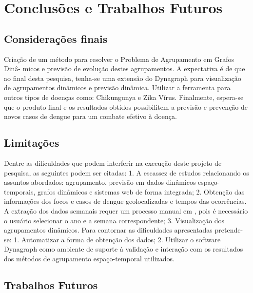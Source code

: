 \chapter{Conclusões e Trabalhos Futuros}
\label{chap:conclusoes-e-trabalhos-futuros}

\section{Considerações finais}
\label{sec:contribuicoes-do-trabalho}

Criação de um método para resolver o Problema de Agrupamento em Grafos Dinâ-
micos e previsão de evolução destes agrupamentos.
A expectativa é de que ao final desta pesquisa, tenha-se uma extensão do Dynagraph
para visualização de agrupamentos dinâmicos e previsão dinâmica.
Utilizar a ferramenta para outros tipos de doenças como: Chikungunya e Zika Vírus.
Finalmente, espera-se que o produto final e os resultados obtidos possibilitem a previsão e
prevenção de novos casos de dengue para um combate efetivo à doença.

\section{Limitações}
\label{sec:limitacoes}

Dentre as dificuldades que podem interferir na execução deste projeto de pesquisa,
as seguintes podem ser citadas:
1. A escassez de estudos relacionando os assuntos abordados: agrupamento, previsão em
dados dinâmicos espaço-temporais, grafos dinâmicos e sistemas web de forma integrada;
2. Obtenção das informações dos focos e casos de dengue geolocalizadas e tempos das
ocorrências. A extração dos dados semanais requer um processo manual em \cite{simda},
pois é necessário o usuário selecionar o ano e a semana correspondente;
3. Visualização dos agrupamentos dinâmicos.
Para contornar as dificuldades apresentadas pretende-se:
1. Automatizar a forma de obtenção dos dados;
2. Utilizar o software Dynagraph como ambiente de suporte à validação e interação com os
resultados dos métodos de agrupamento espaço-temporal utilizados.

\section{Trabalhos Futuros}
\label{sec:trabalhos-futuros}





